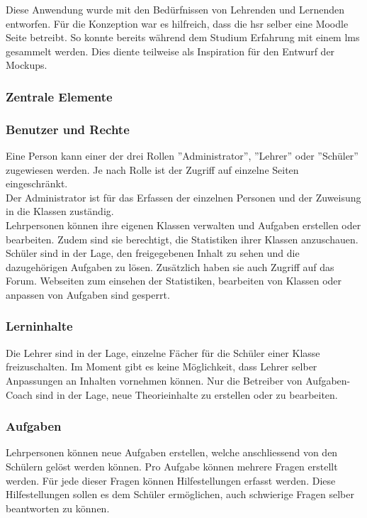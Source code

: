 Diese Anwendung wurde mit den Bedürfnissen von Lehrenden und Lernenden entworfen. Für die Konzeption war es hilfreich, dass die \gls{hsr} selber eine Moodle Seite betreibt. So konnte bereits während dem Studium Erfahrung mit einem \gls{lms} gesammelt werden. Dies diente teilweise als Inspiration für den Entwurf der Mockups.

\subsubsection{Zentrale Elemente}
\subsubsection*{Benutzer und Rechte}
Eine Person kann einer der drei Rollen ''Administrator'', ''Lehrer'' oder ''Schüler'' zugewiesen werden. Je nach Rolle ist der Zugriff auf einzelne Seiten eingeschränkt. \\

Der Administrator ist für das Erfassen der einzelnen Personen und der Zuweisung in die Klassen zuständig. \\

Lehrpersonen können ihre eigenen Klassen verwalten und Aufgaben erstellen oder bearbeiten. Zudem sind sie berechtigt, die Statistiken ihrer Klassen anzuschauen. \\

Schüler sind in der Lage, den freigegebenen Inhalt zu sehen und die dazugehörigen Aufgaben zu lösen. Zusätzlich haben sie auch Zugriff auf das Forum. Webseiten zum einsehen der Statistiken, bearbeiten von Klassen oder anpassen von Aufgaben sind gesperrt.

\subsubsection*{Lerninhalte}
Die Lehrer sind in der Lage, einzelne Fächer für die Schüler einer Klasse freizuschalten. Im Moment gibt es keine Möglichkeit, dass Lehrer selber Anpassungen an Inhalten vornehmen können. Nur die Betreiber von Aufgaben-Coach sind in der Lage, neue Theorieinhalte zu erstellen oder zu bearbeiten.

\subsubsection*{Aufgaben}
Lehrpersonen können neue Aufgaben erstellen, welche anschliessend von den Schülern gelöst werden können. Pro Aufgabe können mehrere Fragen erstellt werden. Für jede dieser Fragen können Hilfestellungen erfasst werden. Diese Hilfestellungen sollen es dem Schüler ermöglichen, auch schwierige Fragen selber beantworten zu können. \\

